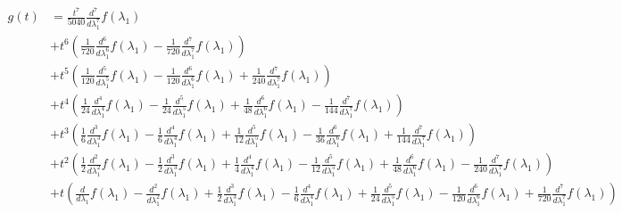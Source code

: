\begin{displaymath}
\begin{split}
g{\left (t \right )} &= \frac{t^{7}}{5040} \frac{d^{7}}{d \lambda_{1}^{7}}  f{\left (\lambda_{1} \right )} \\
                     &+ t^{6} \left(\frac{1}{720} \frac{d^{6}}{d \lambda_{1}^{6}}  f{\left (\lambda_{1} \right )} - \frac{1}{720} \frac{d^{7}}{d \lambda_{1}^{7}}  f{\left (\lambda_{1} \right )}\right) \\
                     &+ t^{5} \left(\frac{1}{120} \frac{d^{5}}{d \lambda_{1}^{5}}  f{\left (\lambda_{1} \right )} - \frac{1}{120} \frac{d^{6}}{d \lambda_{1}^{6}}  f{\left (\lambda_{1} \right )} + \frac{1}{240} \frac{d^{7}}{d \lambda_{1}^{7}}  f{\left (\lambda_{1} \right )}\right) \\
                     &+ t^{4} \left(\frac{1}{24} \frac{d^{4}}{d \lambda_{1}^{4}}  f{\left (\lambda_{1} \right )} - \frac{1}{24} \frac{d^{5}}{d \lambda_{1}^{5}}  f{\left (\lambda_{1} \right )} + \frac{1}{48} \frac{d^{6}}{d \lambda_{1}^{6}}  f{\left (\lambda_{1} \right )} - \frac{1}{144} \frac{d^{7}}{d \lambda_{1}^{7}}  f{\left (\lambda_{1} \right )}\right) \\
                     &+ t^{3} \left(\frac{1}{6} \frac{d^{3}}{d \lambda_{1}^{3}}  f{\left (\lambda_{1} \right )} - \frac{1}{6} \frac{d^{4}}{d \lambda_{1}^{4}}  f{\left (\lambda_{1} \right )} + \frac{1}{12} \frac{d^{5}}{d \lambda_{1}^{5}}  f{\left (\lambda_{1} \right )} - \frac{1}{36} \frac{d^{6}}{d \lambda_{1}^{6}}  f{\left (\lambda_{1} \right )} + \frac{1}{144} \frac{d^{7}}{d \lambda_{1}^{7}}  f{\left (\lambda_{1} \right )}\right) \\
                     &+ t^{2} \left(\frac{1}{2} \frac{d^{2}}{d \lambda_{1}^{2}}  f{\left (\lambda_{1} \right )} - \frac{1}{2} \frac{d^{3}}{d \lambda_{1}^{3}}  f{\left (\lambda_{1} \right )} + \frac{1}{4} \frac{d^{4}}{d \lambda_{1}^{4}}  f{\left (\lambda_{1} \right )} - \frac{1}{12} \frac{d^{5}}{d \lambda_{1}^{5}}  f{\left (\lambda_{1} \right )} + \frac{1}{48} \frac{d^{6}}{d \lambda_{1}^{6}}  f{\left (\lambda_{1} \right )} - \frac{1}{240} \frac{d^{7}}{d \lambda_{1}^{7}}  f{\left (\lambda_{1} \right )}\right) \\
                     &+ t \left(\frac{d}{d \lambda_{1}} f{\left (\lambda_{1} \right )} - \frac{d^{2}}{d \lambda_{1}^{2}}  f{\left (\lambda_{1} \right )} + \frac{1}{2} \frac{d^{3}}{d \lambda_{1}^{3}}  f{\left (\lambda_{1} \right )} - \frac{1}{6} \frac{d^{4}}{d \lambda_{1}^{4}}  f{\left (\lambda_{1} \right )} + \frac{1}{24} \frac{d^{5}}{d \lambda_{1}^{5}}  f{\left (\lambda_{1} \right )} - \frac{1}{120} \frac{d^{6}}{d \lambda_{1}^{6}}  f{\left (\lambda_{1} \right )} + \frac{1}{720} \frac{d^{7}}{d \lambda_{1}^{7}}  f{\left (\lambda_{1} \right )}\right) \\

\end{split}
\end{displaymath}
